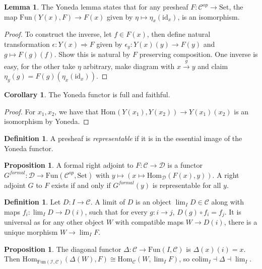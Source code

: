 \documentclass[a4paper,10pt]{article}
\theoremstyle{definition}
\newtheorem{definition}[theorem]{Definition}
\newtheorem{corollary}[theorem]{Corollary}
\newtheorem{lemma}[theorem]{Lemma}
\newtheorem{proposition}[theorem]{Proposition}
\newcommand{\Hom}[3][C]{\mathrm{Hom}_\mathcal{#1}(#2, #3)}
\newcommand{\C}{\mathcal{C}}
\newcommand{\D}{\mathcal{D}}
\newcommand{\id}{\mathrm{id}}
\newcommand{\Set}{\mathrm{Set}}
\begin{document}
\begin{lemma}
    The Yoneda lemma states that for any presheaf $F \colon \C^{op} \rightarrow \Set$, the map $\mathrm{Fun}(Y(x), F) \rightarrow F(x)$ given by $\eta \mapsto \eta_x(\id_x)$, is an isomorphism.
\end{lemma}

\begin{proof}
    To construct the inverse, let $f \in F(x)$, then define natural transformation $\epsilon \colon Y(x) \Rightarrow F$ given by $\epsilon_y \colon Y(x)(y) \rightarrow F(y)$ and $g \mapsto F(g)(f)$. Show this is natural by $F$ preserving composition. One inverse is easy, for the other take $\eta$ arbitrary, make diagram with $x \xrightarrow{g} y$ and claim $\eta_y(g) = F(g)(\eta_x(\id_x))$.
\end{proof}

\begin{corollary}
    The Yoneda functor is full and faithful.
\end{corollary}
\begin{proof}
    For $x_1, x_2$, we have that $\Hom[{}]{Y({x_1})}{Y(x_2)} \longrightarrow Y(x_1)(x_2)$ is an isomorphism by Yoneda. 
\end{proof}

\begin{definition}
    A presheaf is \emph{representable} if it is in the essential image of the Yoneda functor.
\end{definition}

\begin{proposition}
    A formal right adjoint to $F \colon \C \rightarrow \D$ is a functor $G^{\mathit{formal}} \colon \mathcal{D} \rightarrow \mathrm{Fun}(\C^{op}, \Set)$ with $y \mapsto (x \mapsto \Hom[D]{F(x)}{y})$. A right adjoint $G$ to $F$ exists if and only if $G^{formal}(y)$ is representable for all $y$.
\end{proposition}

\begin{definition}
    Let $D \colon I \rightarrow \C$. A limit of $D$ is an object $\lim_I D \in \C$ along with maps $f_i \colon \lim_I D \rightarrow D(i)$, such that for every $g \colon i \rightarrow j$, $D(g) \circ f_i = f_j$. It is universal as for any other object $W$ with compatible maps $W \rightarrow D(i)$, there is a unique morphism $W \rightarrow \lim_I F$.
\end{definition}

\begin{proposition}
    The diagonal functor $\Delta \colon \C \rightarrow \mathrm{Fun}(I, \C)$ is  $\Delta(x)(i) = x$. Then $\Hom[\mathrm{Fun}(I, \C)]{\Delta(W)}{F} \cong \Hom{W}{\lim_I F}$, so $\mathrm{colim}_I \dashv \Delta \dashv \lim_I$.
\end{proposition}
\end{document}
